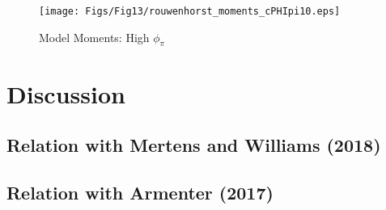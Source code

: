 \documentclass[11pt]{article}
\begin{document}
	\begin{figure}[!ht]
		\begin{center}
			\caption{Model Moments: High  $\phi_{\pi}$}
			\texttt{[image: Figs/Fig13/rouwenhorst\_moments\_cPHIpi10.eps]}\label{fig:MomentsHighcPHIpi}
		\end{center}
	\end{figure}
			
	\section{Discussion}
	\label{S:Discussion}
	
	\subsection{Relation with Mertens and Williams (2018)}
	
	
	
	\subsection{Relation with Armenter (2017)}
	
	
	
\end{document}
